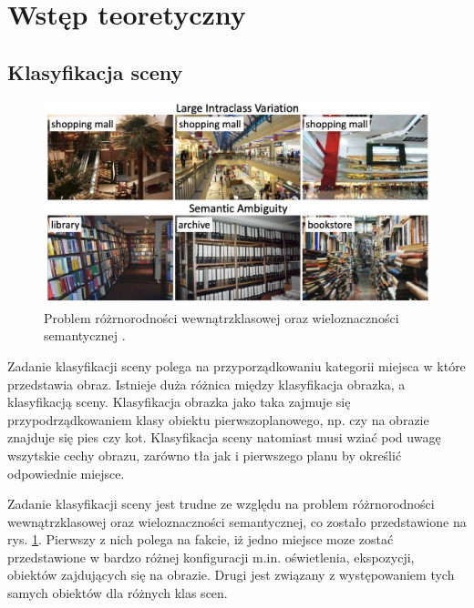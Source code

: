 \section{Wstęp teoretyczny}
\subsection{Klasyfikacja sceny}
\begin{figure}
    \includegraphics[width=\textwidth]{images/scene_class.png}
    \caption{Problem różrnorodności wewnątrzklasowej oraz wieloznaczności semantycznej \cite{zeng2021deep}.}
    \label{fig:scene-class}
\end{figure}

Zadanie klasyfikacji sceny polega na przyporządkowaniu kategorii miejsca w które przedstawia obraz. Istnieje duża różnica między klasyfikacja obrazka, a klasyfikacją sceny. Klasyfikacja obrazka jako taka zajmuje się przypodrządkowaniem klasy obiektu pierwszoplanowego, np. czy na obrazie znajduje się pies czy kot. Klasyfikacja sceny natomiast musi wziać pod uwagę wszytskie cechy obrazu, zarówno tła jak i pierwszego planu by określić odpowiednie miejsce.

Zadanie klasyfikacji sceny jest trudne ze względu na problem różrnorodności wewnątrzklasowej oraz wieloznaczności semantycznej, co zostało przedstawione na rys. \ref{fig:scene-class}. Pierwszy z nich polega na fakcie, iż jedno miejsce moze zostać przedstawione w bardzo różnej konfiguracji m.in. oświetlenia, ekspozycji, obiektów zajdujących się na obrazie. Drugi jest związany z występowaniem tych samych obiektów dla różnych klas scen.

